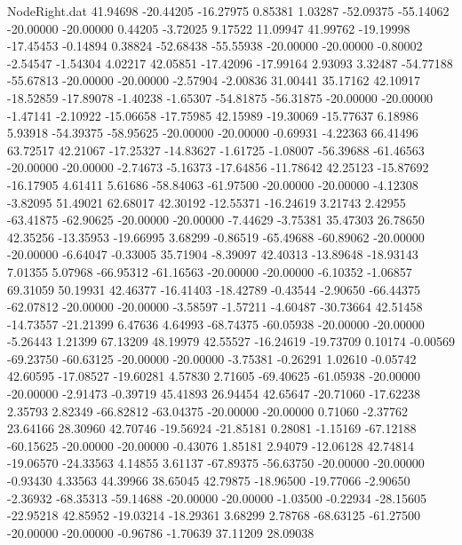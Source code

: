 \begin{filecontents}{NodeRight.dat}
  41.94698  -20.44205  -16.27975     0.85381    1.03287  -52.09375  -55.14062  -20.00000  -20.00000    0.44205   -3.72025    9.17522   11.09947
  41.99762  -19.19998  -17.45453    -0.14894    0.38824  -52.68438  -55.55938  -20.00000  -20.00000   -0.80002   -2.54547   -1.54304    4.02217
  42.05851  -17.42096  -17.99164     2.93093    3.32487  -54.77188  -55.67813  -20.00000  -20.00000   -2.57904   -2.00836   31.00441   35.17162
  42.10917  -18.52859  -17.89078    -1.40238   -1.65307  -54.81875  -56.31875  -20.00000  -20.00000   -1.47141   -2.10922  -15.06658  -17.75985
  42.15989  -19.30069  -15.77637     6.18986    5.93918  -54.39375  -58.95625  -20.00000  -20.00000   -0.69931   -4.22363   66.41496   63.72517
  42.21067  -17.25327  -14.83627    -1.61725   -1.08007  -56.39688  -61.46563  -20.00000  -20.00000   -2.74673   -5.16373  -17.64856  -11.78642
  42.25123  -15.87692  -16.17905     4.61411    5.61686  -58.84063  -61.97500  -20.00000  -20.00000   -4.12308   -3.82095   51.49021   62.68017
  42.30192  -12.55371  -16.24619     3.21743    2.42955  -63.41875  -62.90625  -20.00000  -20.00000   -7.44629   -3.75381   35.47303   26.78650
  42.35256  -13.35953  -19.66995     3.68299   -0.86519  -65.49688  -60.89062  -20.00000  -20.00000   -6.64047   -0.33005   35.71904   -8.39097
  42.40313  -13.89648  -18.93143     7.01355    5.07968  -66.95312  -61.16563  -20.00000  -20.00000   -6.10352   -1.06857   69.31059   50.19931
  42.46377  -16.41403  -18.42789    -0.43544   -2.90650  -66.44375  -62.07812  -20.00000  -20.00000   -3.58597   -1.57211   -4.60487  -30.73664
  42.51458  -14.73557  -21.21399     6.47636    4.64993  -68.74375  -60.05938  -20.00000  -20.00000   -5.26443    1.21399   67.13209   48.19979
  42.55527  -16.24619  -19.73709     0.10174   -0.00569  -69.23750  -60.63125  -20.00000  -20.00000   -3.75381   -0.26291    1.02610   -0.05742
  42.60595  -17.08527  -19.60281     4.57830    2.71605  -69.40625  -61.05938  -20.00000  -20.00000   -2.91473   -0.39719   45.41893   26.94454
  42.65647  -20.71060  -17.62238     2.35793    2.82349  -66.82812  -63.04375  -20.00000  -20.00000    0.71060   -2.37762   23.64166   28.30960
  42.70746  -19.56924  -21.85181     0.28081   -1.15169  -67.12188  -60.15625  -20.00000  -20.00000   -0.43076    1.85181    2.94079  -12.06128
  42.74814  -19.06570  -24.33563     4.14855    3.61137  -67.89375  -56.63750  -20.00000  -20.00000   -0.93430    4.33563   44.39966   38.65045
  42.79875  -18.96500  -19.77066    -2.90650   -2.36932  -68.35313  -59.14688  -20.00000  -20.00000   -1.03500   -0.22934  -28.15605  -22.95218
  42.85952  -19.03214  -18.29361     3.68299    2.78768  -68.63125  -61.27500  -20.00000  -20.00000   -0.96786   -1.70639   37.11209   28.09038

\end{filecontents}
